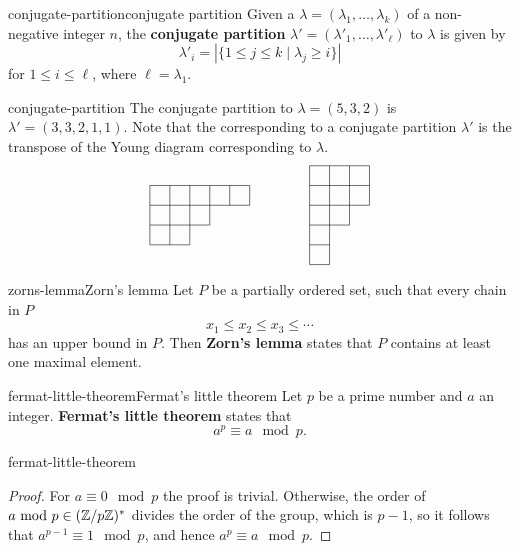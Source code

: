 \begin{topic}{conjugate-partition}{conjugate partition}
    Given a  $\lambda = (\lambda_1, \ldots, \lambda_k)$ of a non-negative integer $n$, the \textbf{conjugate partition} $\lambda' = (\lambda'_1, \ldots, \lambda'_\ell)$ to $\lambda$ is given by
    \[ \lambda'_i = | \{ 1 \le j \le k \mid \lambda_j \ge i \} | \]
    for $1 \le i \le \ell$, where $\ell = \lambda_1$.
\end{topic}

\begin{example}{conjugate-partition}
    The conjugate partition to $\lambda = (5, 3, 2)$ is $\lambda' = (3, 3, 2, 1, 1)$. Note that the  corresponding to a conjugate partition $\lambda'$ is the transpose of the Young diagram corresponding to $\lambda$.
    \[ \begin{tikzpicture}
        \begin{scope}[scale=0.5]
            \draw (0, 3) -- (5, 3); \draw (0, 2) -- (5, 2); \draw (0, 1) -- (3, 1); \draw (0, 0) -- (2, 0); \draw (0, 3) -- (0, 0); \draw (1, 3) -- (1, 0); \draw (2, 3) -- (2, 0); \draw (3, 3) -- (3, 1); \draw (4, 3) -- (4, 2); \draw (5, 3) -- (5, 2);
        \end{scope}
        \begin{scope}[scale=0.5, shift={(8, -1)}]
            \draw (0, 5) -- (3, 5); \draw (0, 4) -- (3, 4); \draw (0, 3) -- (3, 3); \draw (0, 2) -- (2, 2); \draw (0, 1) -- (1, 1); \draw (0, 0) -- (1, 0); \draw (0, 0) -- (0, 5); \draw (1, 0) -- (1, 5); \draw (2, 2) -- (2, 5); \draw (3, 3) -- (3, 5);
        \end{scope}
    \end{tikzpicture}\]
\end{example}

\begin{topic}{zorns-lemma}{Zorn's lemma}
    Let $P$ be a partially ordered set, such that every chain in $P$
    \[ x_1 \le x_2 \le x_3 \le \cdots \]
    has an upper bound in $P$. Then \textbf{Zorn's lemma} states that $P$ contains at least one maximal element.
\end{topic}

\begin{topic}{fermat-little-theorem}{Fermat's little theorem}
    Let $p$ be a prime number and $a$ an integer. \textbf{Fermat's little theorem} states that
    \[ a^p \equiv a \mod p . \]
\end{topic}

\begin{example}{fermat-little-theorem}
    \begin{proof}
        For $a \equiv 0 \mod p$ the proof is trivial. Otherwise, the order of $a \textup{ mod } p \in (\mathbb{Z}/p\mathbb{Z})^*$ divides the order of the group, which is $p - 1$, so it follows that $a^{p - 1} \equiv 1 \mod p$, and hence $a^p \equiv a \mod p$.
    \end{proof}
\end{example}
